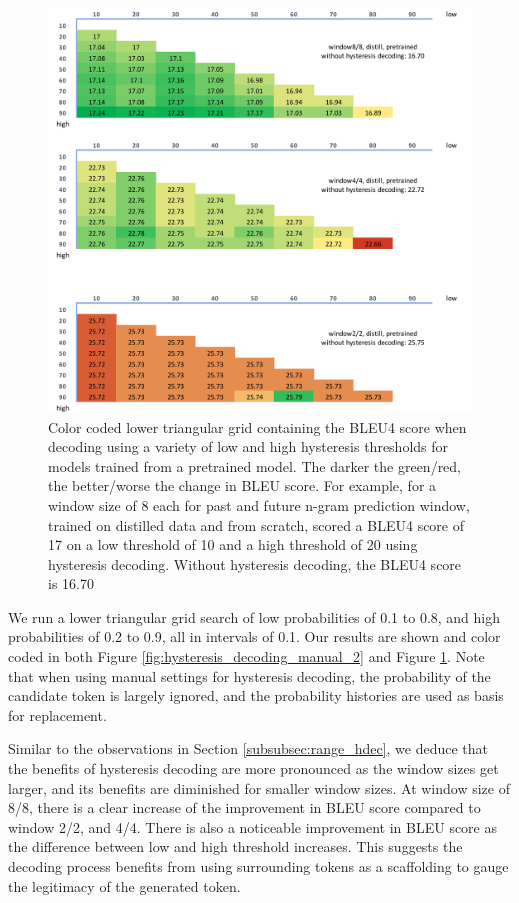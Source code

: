 \begin{figure}[hpbt!]

    \centering
    \includegraphics[width=\textwidth]{images/chap04_images/hysteresis_decoding_manual_1.pdf}
    \caption{Color coded lower triangular grid containing the BLEU4 score when decoding using a variety of low and high hysteresis thresholds for models trained from a pretrained model. The darker the green/red, the better/worse the change in BLEU score. For example, for a window size of 8 each for past and future n-gram prediction window, trained on distilled data and from scratch, scored a BLEU4 score of 17 on a low threshold of 10 and a high threshold of 20 using hysteresis decoding. Without hysteresis decoding, the BLEU4 score is 16.70}
    \label{fig:hysteresis_decoding_manual_1}
\end{figure}


We run a lower triangular grid search of low probabilities of 0.1 to 0.8, and high probabilities of 0.2 to 0.9, all in intervals of 0.1. Our results are shown and color coded in both Figure \ref{fig:hysteresis_decoding_manual_2} and Figure \ref{fig:hysteresis_decoding_manual_1}. Note that when using manual settings for hysteresis decoding, the probability of the candidate token is largely ignored, and the probability histories are used as basis for replacement.

Similar to the observations in Section \ref{subsubsec:range_hdec}, we deduce that the benefits of hysteresis decoding are more pronounced as the window sizes get larger, and its benefits are diminished for smaller window sizes. At window size of 8/8, there is a clear increase of the improvement in BLEU score compared to window 2/2, and 4/4. There is also a noticeable improvement in BLEU score as the difference between low and high threshold increases. This suggests the decoding process benefits from using surrounding tokens as a scaffolding to gauge the legitimacy of the generated token.

